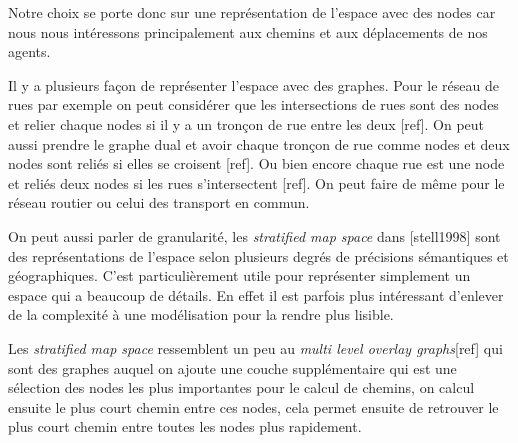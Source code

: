 \documentclass[a4paper]{article}
\begin{document}
Notre choix se porte donc sur une représentation de l'espace avec des nodes car
nous nous intéressons principalement aux chemins et aux déplacements de nos
agents.

Il y a plusieurs façon de représenter l'espace avec des graphes. Pour le réseau
de rues par exemple on peut considérer que les intersections de rues sont des
nodes et relier chaque nodes si il y a un tronçon de rue entre les deux [ref].
On peut aussi prendre le graphe dual et avoir chaque tronçon de rue comme nodes
et deux nodes sont reliés si elles se croisent [ref]. Ou bien encore chaque rue
est une node et reliés deux nodes si les rues s'intersectent [ref]. On peut
faire de même pour le réseau routier ou celui des transport en commun.

On peut aussi parler de granularité, les \emph{stratified map space} dans
[stell1998] sont des représentations de l'espace selon plusieurs degrés de
précisions sémantiques et géographiques. C'est particulièrement utile pour
représenter simplement un espace qui a beaucoup de détails. En effet il est
parfois plus intéressant d'enlever de la complexité à une modélisation pour la
rendre plus lisible.

Les \emph{stratified map space} ressemblent un peu au \emph{multi level overlay
graphs}[ref] qui sont des graphes auquel on ajoute une couche supplémentaire
qui est une sélection des nodes les plus importantes pour le calcul de chemins,
on calcul ensuite le plus court chemin entre ces nodes, cela permet ensuite de
retrouver le plus court chemin entre toutes les nodes plus rapidement.
\end{document}
